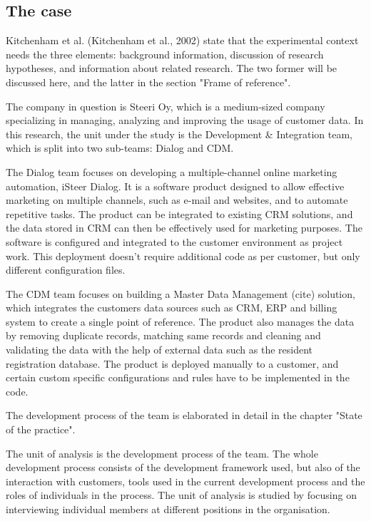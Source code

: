 \documentclass[english]{tktltiki2}
\theoremstyle{definition}
\theoremstyle{remark}
\begin{document}
\subsection{The case} %
Kitchenham et al. (Kitchenham et al., 2002) state that the experimental context needs the three elements: background information, discussion of research hypotheses, and information about related research. The two former will be discussed here, and the latter in the section "Frame of reference".

The company in question is Steeri Oy, which is a medium-sized company specializing in managing, analyzing and improving the usage of customer data. In this research, the unit under the study is the Development & Integration team, which is split into two sub-teams: Dialog and CDM. 

The Dialog team focuses on developing a multiple-channel online marketing automation, iSteer Dialog. It is a software product designed to allow effective marketing on multiple channels, such as e-mail and websites, and to automate repetitive tasks. The product can be integrated to existing CRM solutions, and the data stored in CRM can then be effectively used for marketing purposes. The software is configured and integrated to the customer environment as project work. This deployment doesn't require additional code as per customer, but only different configuration files. 

The CDM team focuses on building a Master Data Management (cite) solution, which integrates the customers data sources such as CRM, ERP and billing system to create a single point of reference. The product also manages the data by removing duplicate records, matching same records and cleaning and validating the data with the help of external data such as the resident registration database. The product is deployed manually to a customer, and certain custom specific configurations and rules have to be implemented in the code. 

The development process of the team is elaborated in detail in the chapter "State of the practice". 

The unit of analysis is the development process of the team. The whole development process consists of the development framework used, but also of the interaction with customers, tools used in the current development process and the roles of individuals in the process. The unit of analysis is studied by focusing on interviewing individual members at different positions in the organisation. 
\end{document}
